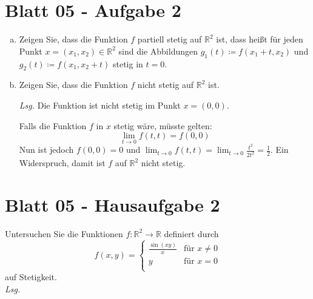 \documentclass{scrreprt}
\begin{document}
\section{Blatt 05 - Aufgabe 2}

\begin{enumerate}[a)]
\item Zeigen Sie, dass die Funktion $f$ partiell stetig auf $\mathbb{R}^2$ ist,
  dass heißt für jeden Punkt $x = (x_1, x_2) \in \mathbb{R}^2$ sind die
  Abbildungen $g_1(t) \coloneqq f(x_1 + t, x_2)$ und
  $g_2(t) \coloneqq f(x_1, x_2 + t)$ stetig in $t = 0$.
\item Zeigen Sie, dass die Funktion $f$ nicht stetig auf $\mathbb{R}^2$ ist.

  \textit{Lsg.} Die Funktion ist nicht stetig im Punkt $x = (0, 0)$.

  Falls die Funktion $f$ in $x$ stetig wäre, müsste gelten:
  \[
    \lim_{t \to 0} f(t, t) = f(0, 0)
  \]
  Nun ist jedoch $f(0, 0) = 0$ und
  $\lim_{t \to 0} f(t, t) = \lim_{t \to 0} \frac{t^2}{2t^2} = \frac{1}{2}$.
  Ein Widerspruch, damit ist $f$ auf $\mathbb{R}^2$ nicht stetig.
\end{enumerate}

\section{Blatt 05 - Hausaufgabe 2}

Untersuchen Sie die Funktionen $f \colon \mathbb{R}^2 \to \mathbb{R}$ definiert
durch
\[
  f(x, y) = \begin{cases}
    \frac{\sin(xy)}{x} & \text{für } x \ne 0 \\
    y & \text{für } x = 0 \\
  \end{cases}
\]
auf Stetigkeit. \\

\textit{Lsg.}
\begin{center}
\end{center}
\end{document}
